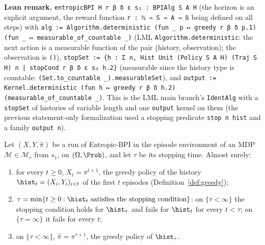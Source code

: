 \textbf{Lean remark.} \texttt{entropicBPI H r β δ ε s₁ : BPIAlg S A H} (the horizon is an
explicit argument, the reward function \texttt{r : ℕ → S → A → ℝ} being defined on all steps) with
\texttt{alg := Algorithm.deterministic (fun \_ p ↦ greedy r β δ p.1) (fun \_ ↦ measurable\_of\_countable \_)}
(LML \texttt{Algorithm.deterministic}: the next action is a measurable function of the pair (history,
observation); the observation is \texttt{()}), \texttt{stopSet := \{h : Σ n, Hist Unit (Policy S A H) (Traj S H) n | stopCond r β δ ε s₁ h.2\}}
(measurable since the history type is countable: \texttt{(Set.to\_countable \_).measurableSet}),
and \texttt{output := Kernel.deterministic (fun h ↦ greedy r β δ h.2) (measurable\_of\_countable \_)}.
This is the LML main branch's \texttt{IdentAlg} with a \texttt{stopSet} of histories of
variable length and one \texttt{output} kernel on them (the previous statement-only
formalization used a stopping predicate \texttt{stop n hist} and a family \texttt{output n}).

\begin{lemma}\label{lem:entropic_bpi_run}
\leanok
{}
Let $(X, Y, \hat\pi)$ be a run of Entropic-BPI in the episode environment of an MDP
$\mathcal M \in \mathcal M_r$ from $s_1$, on $(\Omega, \Prob)$, and let $\tau$ be its stopping time.
Almost surely:
\begin{enumerate}
  \item[(i)] for every $t \ge 0$, $X_t = \pi^{t+1}$, the greedy policy of the history $\hist_t = (X_i, Y_i)_{i < t}$
        of the first $t$ episodes (Definition~\ref{def:greedy});
  \item[(ii)] $\tau = \min\{t \ge 0 : \hist_t \text{ satisfies the stopping condition}\}$: on
        $\{\tau < \infty\}$ the stopping condition holds for $\hist_\tau$ and fails for $\hist_t$
        for every $t < \tau$; on $\{\tau = \infty\}$ it fails for every $t$;
  \item[(iii)] on $\{\tau < \infty\}$, $\hat\pi = \pi^{\tau + 1}$, the greedy policy of $\hist_\tau$.
\end{enumerate}
\end{lemma}

